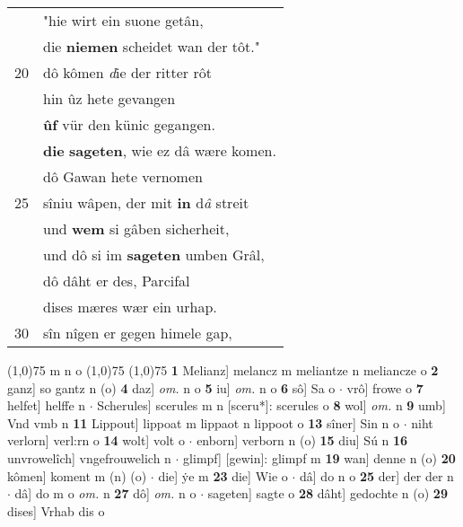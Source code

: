 \documentclass[8pt,a4paper,notitlepage]{article}
\begin{document}
\begin{table}[ht]
\begin{minipage}[t]{0.5\linewidth}
\begin{tabular}{rl}
 & "hie wirt ein suone getân,\\ 
 & die \textbf{niemen} scheidet wan der tôt."\\ 
20 & dô kômen \textit{d}ie der ritter rôt\\ 
 & hin ûz hete gevangen\\ 
 & \textbf{ûf} vür den künic gegangen.\\ 
 & \textbf{die} \textbf{sageten}, wie ez dâ wære komen.\\ 
 & dô Gawan hete vernomen\\ 
25 & sîniu wâpen, der mit \textbf{in} d\textit{â} streit\\ 
 & und \textbf{wem} si gâben sicherheit,\\ 
 & und dô si im \textbf{sageten} umben Grâl,\\ 
 & dô dâht er des, Parcifal\\ 
 & dises mæres wær ein urhap.\\ 
30 & sîn nîgen er gegen himele gap,\\ 
\end{tabular}
\scriptsize
\line(1,0){75} \newline
m n o \newline
\line(1,0){75} \newline
\newline
\line(1,0){75} \newline
\textbf{1} Melianz] melancz m meliantze n meliancze o \textbf{2} ganz] so gantz n (o) \textbf{4} daz] \textit{om.} n o \textbf{5} iu] \textit{om.} n o \textbf{6} sô] Sa o  $\cdot$ vrô] frowe o \textbf{7} helfet] helffe n  $\cdot$ Scherules] scerules m n [sceru*]: scerules o \textbf{8} wol] \textit{om.} n \textbf{9} umb] Vnd vmb n \textbf{11} Lippout] lippoat m lippaot n lippoot o \textbf{13} sîner] Sin n o  $\cdot$ niht verlorn] verl:rn o \textbf{14} wolt] volt o  $\cdot$ enborn] verborn n (o) \textbf{15} diu] Sú n \textbf{16} unvrowelîch] vngefrouwelich n  $\cdot$ glimpf] [gewin]: glimpf m \textbf{19} wan] denne n (o) \textbf{20} kômen] koment m (n) (o)  $\cdot$ die] ẏe m \textbf{23} die] Wie o  $\cdot$ dâ] do n o \textbf{25} der] der der n  $\cdot$ dâ] do m o \textit{om.} n \textbf{27} dô] \textit{om.} n o  $\cdot$ sageten] sagte o \textbf{28} dâht] gedochte n (o) \textbf{29} dises] Vrhab dis o \newline
\end{minipage}
\end{table}
\newpage
\end{document}
